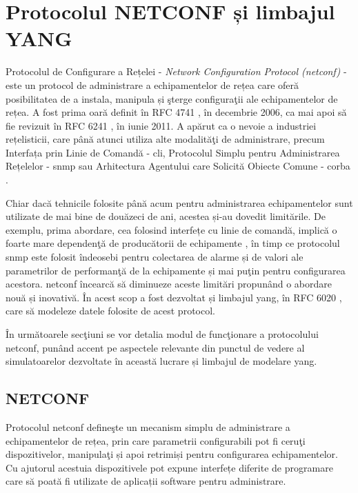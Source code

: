 \section{Protocolul NETCONF și limbajul YANG}

Protocolul de Configurare a Rețelei - \textit{Network Configuration Protocol (\gls{netconf})} - este un protocol de administrare a echipamentelor de rețea care oferă posibilitatea de a instala, manipula și şterge configuraţii ale echipamentelor de rețea. A fost prima oară definit în RFC 4741 \cite{rfc4741}, în decembrie 2006, ca mai apoi să fie revizuit în RFC 6241 \cite{rfc6241}, în iunie 2011. A apărut ca o nevoie a industriei rețelisticii, care până atunci utiliza alte modalităţi de administrare, precum Interfața prin Linie de Comandă - \gls{cli}, Protocolul Simplu pentru Administrarea Rețelelor - \gls{snmp} sau Arhitectura Agentului care Solicită Obiecte Comune - \gls{corba} \cite{yu2010empirical}.

Chiar dacă tehnicile folosite până acum pentru administrarea echipamentelor sunt utilizate de mai bine de douăzeci de ani, acestea și-au dovedit limitările. De exemplu, prima abordare, cea folosind interfețe cu linie de comandă, implică o foarte mare dependenţă de producătorii de echipamente \cite{elbadawi2011improving}, în timp ce protocolul \gls{snmp} este folosit îndeosebi pentru colectarea de alarme și de valori ale parametrilor de performanţă de la echipamente și mai puţin pentru configurarea acestora. \gls{netconf} încearcă să diminueze aceste limitări propunând o abordare nouă și inovativă. În acest scop a fost dezvoltat și limbajul \gls{yang}, în RFC 6020 \cite{rfc6020}, care să modeleze datele folosite de acest protocol.

În următoarele secţiuni se vor detalia modul de funcţionare a protocolului \gls{netconf}, punând accent pe aspectele relevante din punctul de vedere al simulatoarelor dezvoltate în această lucrare și limbajul de modelare \gls{yang}.

\subsection{NETCONF}

Protocolul \gls{netconf} defineşte un mecanism simplu de administrare a echipamentelor de rețea, prin care parametrii configurabili pot fi ceruţi dispozitivelor, manipulaţi și apoi retrimiși pentru configurarea echipamentelor. Cu ajutorul acestuia dispozitivele pot expune interfețe diferite de programare care să poată fi utilizate de aplicații software pentru administrare.

